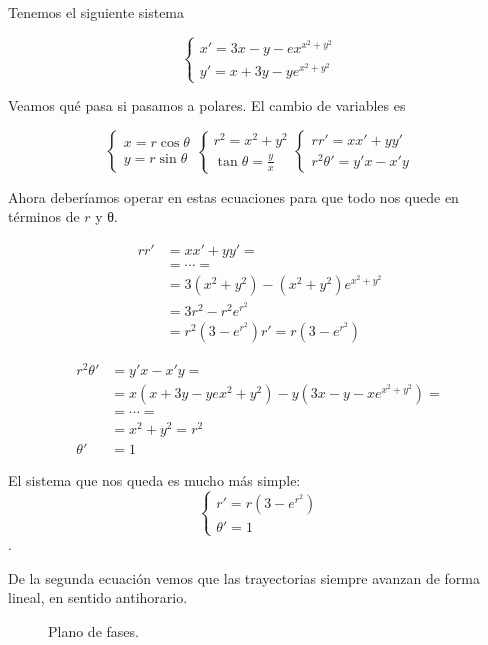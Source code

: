 \begin{example}
Tenemos el siguiente sistema

\[ \begin{cases} x' = 3x - y - ex^{x^2+y^2} \\
y' = x+ 3y -ye^{x^2+y^2} \end{cases} \]

Veamos qué pasa si pasamos a polares. El cambio de variables es

\[ \begin{cases} x = r\cos θ \\ y = r \sin θ \end{cases}
\begin{cases} r^2 = x^2+y^2 \\ \tan θ = \frac{y}{x} \end{cases}
\begin{cases} rr' = xx' + yy' \\ r^2θ' = y'x - x' y \end{cases} \]

Ahora deberíamos operar en estas ecuaciones para que todo nos quede en términos de $r$ y θ.

\begin{align*}
 rr' &= xx' + yy' = \\
 &= \cdots = \\
 &= 3(x^2+y^2) - (x^2+y^2)e^{x^2+y^2} \\
 &= 3r^2 - r^2e^{r^2} \\
 &= r^2(3-e^{r^2})
r' = r(3-e^{r^2})
\end{align*}

\begin{align*}
r^2θ' &= y'x - x'y =\\
 &= x(x+3y-ye{x^2+y^2}) -y(3x-y-xe^{x^2+y^2}) = \\
 &= \cdots = \\
 &= x^2 + y^2 = r^2 \\
θ' &= 1
\end{align*}

El sistema que nos queda es mucho más simple: \[ \begin{cases} r' = r(3-e^{r^2}) \\ θ' = 1 \end{cases} \].

De la segunda ecuación vemos que las trayectorias siempre avanzan de forma lineal, en sentido antihorario.

\begin{figure}
\label{img8-Ej4}
\caption{Plano de fases.}
\end{figure}



\end{example}
